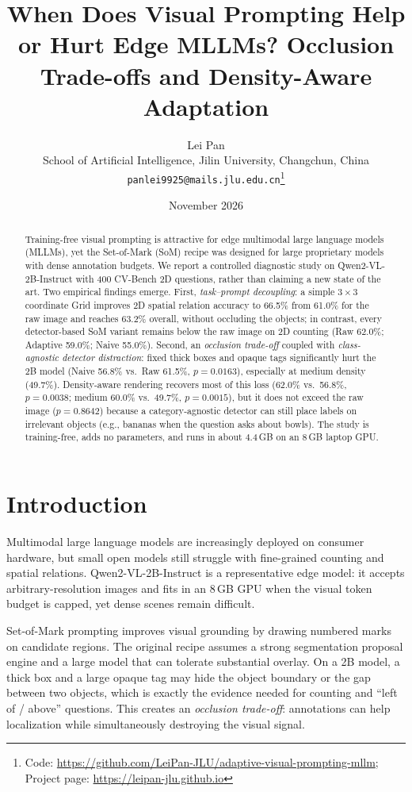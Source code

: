\documentclass[10pt,twocolumn]{article}
\title{\vspace{-0.35in}\textbf{When Does Visual Prompting Help or Hurt Edge MLLMs? Occlusion Trade-offs and Density-Aware Adaptation}}
\author{Lei Pan\\
School of Artificial Intelligence, Jilin University, Changchun, China\\
\texttt{panlei9925@mails.jlu.edu.cn}\thanks{Code: \url{https://github.com/LeiPan-JLU/adaptive-visual-prompting-mllm}; Project page: \url{https://leipan-jlu.github.io}}}
\date{November 2026}
\begin{document}
\maketitle

\begin{abstract}
Training-free visual prompting is attractive for edge multimodal large language models (MLLMs), yet the Set-of-Mark (SoM) recipe was designed for large proprietary models with dense annotation budgets. We report a controlled diagnostic study on Qwen2-VL-2B-Instruct with 400 CV-Bench 2D questions, rather than claiming a new state of the art. Two empirical findings emerge. First, \emph{task--prompt decoupling}: a simple $3\times3$ coordinate Grid improves 2D spatial relation accuracy to 66.5\% from 61.0\% for the raw image and reaches 63.2\% overall, without occluding the objects; in contrast, every detector-based SoM variant remains below the raw image on 2D counting (Raw 62.0\%; Adaptive 59.0\%; Naive 55.0\%). Second, an \emph{occlusion trade-off} coupled with \emph{class-agnostic detector distraction}: fixed thick boxes and opaque tags significantly hurt the 2B model (Naive 56.8\% vs.\ Raw 61.5\%, $p=0.0163$), especially at medium density (49.7\%). Density-aware rendering recovers most of this loss (62.0\% vs.\ 56.8\%, $p=0.0038$; medium 60.0\% vs.\ 49.7\%, $p=0.0015$), but it does not exceed the raw image ($p=0.8642$) because a category-agnostic detector can still place labels on irrelevant objects (e.g., bananas when the question asks about bowls). The study is training-free, adds no parameters, and runs in about 4.4\,GB on an 8\,GB laptop GPU.
\end{abstract}

\section{Introduction}
\label{sec:intro}
Multimodal large language models are increasingly deployed on consumer hardware, but small open models still struggle with fine-grained counting and spatial relations. Qwen2-VL-2B-Instruct is a representative edge model: it accepts arbitrary-resolution images and fits in an 8\,GB GPU when the visual token budget is capped, yet dense scenes remain difficult.

Set-of-Mark prompting improves visual grounding by drawing numbered marks on candidate regions. The original recipe assumes a strong segmentation proposal engine and a large model that can tolerate substantial overlay. On a 2B model, a thick box and a large opaque tag may hide the object boundary or the gap between two objects, which is exactly the evidence needed for counting and ``left of / above'' questions. This creates an \emph{occlusion trade-off}: annotations can help localization while simultaneously destroying the visual signal.
\end{document}
